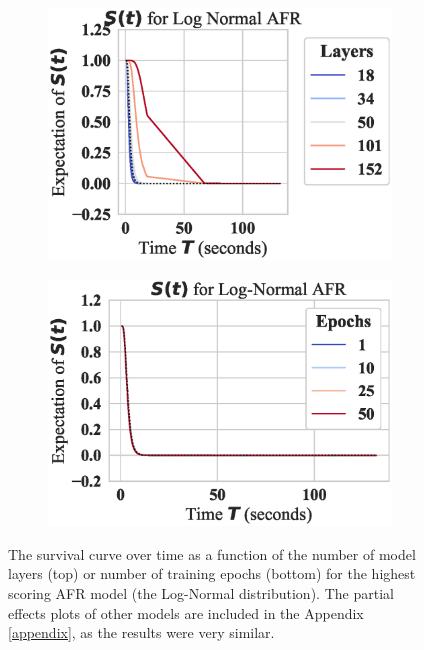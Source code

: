 
% 
\begin{figure}
    \centering
	\begin{subfigure}
	\centering
    \includegraphics[width=.38\textwidth]{cifar100/log_normal_layers_partial_effect.eps}
    \label{fig:layers}
    \end{subfigure}
    \begin{subfigure}
	\centering
    \includegraphics[width=.38\textwidth]{cifar100/log_normal_epochs_partial_effect.eps}
    \label{fig:epochs}
    \end{subfigure}
    \caption{The survival curve over time as a function of the number of model layers (top) or number of training epochs (bottom) for the highest scoring AFR model (the Log-Normal distribution). The partial effects plots of other models are included in the Appendix \ref{appendix}, as the results were very similar.}
\end{figure}
% 


